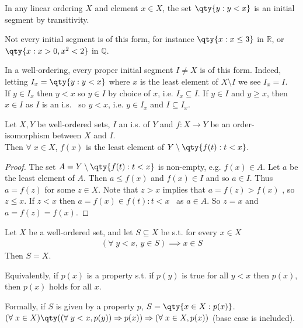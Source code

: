 \begin{remark}
    In any linear ordering $X$ and element $x \in X$, the set $\qty{y : y < x}$ is an initial segment by transitivity.

    Not every initial segment is of this form, for instance $\qty{x : x \leq 3}$ in $\mathbb R$, or $\qty{x : x > 0, x^2 < 2}$ in $\mathbb Q$.
\end{remark}

\begin{remark}
    In a well-ordering, every proper initial segment $I \neq X$ is of this form.
    Indeed, letting $I_x = \qty{y : y < x}$ where $x$ is the least element of $X \setminus I$ we see $I_x = I$. \\
    If $y \in I_x$ then $y < x$ so $y \in I$ by choice of $x$, i.e. $I_x \subseteq I$.
    If $y \in I$ and $y \geq x$, then $x \in I$ as $I$ is an i.s. \Lightning \ so $y < x$, i.e. $y \in I_x$ and $I \subseteq I_x$.
\end{remark}

\begin{lemma} \label{lem:1}
    Let $X, Y$ be well-ordered sets, $I$ an i.s. of $Y$ and $f : X \to Y$ be an order-isomorphism between $X$ and $I$. \\
    Then $\forall \; x \in X$, $f(x)$ is the least element of $Y \setminus \qty{f(t) : t < x}$.
\end{lemma}

\begin{proof}
    The set $A = Y \setminus \qty{f(t) : t < x}$ is non-empty, e.g. $f(x) \in A$.
    Let $a$ be the least element of $A$.
    Then $a \leq f(x)$ and $f(x) \in I$ and so $a \in I$.
    Thus $a = f(z)$ for some $z \in X$.
    Note that $z > x$ implies that $a = f(z) > f(x)$ \Lightning, so $z \leq x$.
    If $z < x$ then $a = f(x) \in {f(t) : t < x}$ \Lightning \ as $a \in A$.
    So $z = x$ and $a = f(z) = f(x)$.
\end{proof}

\begin{proposition}
    Let $X$ be a well-ordered set, and let $S \subseteq X$ be s.t. for every $x \in X$
    \begin{align*}
    (\forall \; y < x,\, y \in S) \implies x \in S
    \end{align*}
    Then $S = X$.
\end{proposition}

\begin{remark}
    Equivalently, if $p(x)$ is a property s.t. if $p(y)$ is true for all $y < x$ then $p(x)$, then $p(x)$ holds for all $x$.

    Formally, if $S$ is given by a property $p$, $S = \qty{x \in X : p(x)}$. \\
    $(\forall \; x \in X)\qty((\forall \; y < x, p(y)) \implies p(x)) \implies (\forall \; x \in X, p(x))$ (base case is included).
\end{remark}

